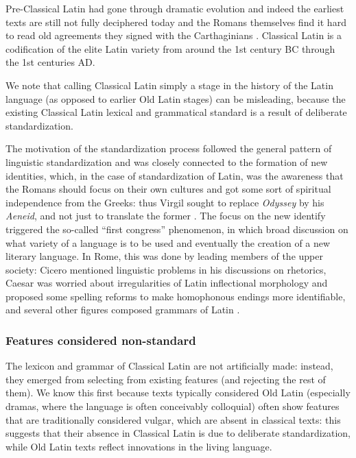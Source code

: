 \documentclass[a4paper, oneside, 12pt]{report}
\newcommand*{\citepage}[1]{p.~{#1}}
\newcommand*{\citepages}[1]{pp.~{#1}}
\newcommand{\literature}[1]{\textit{#1}}
\begin{document}
Pre-Classical Latin had gone through dramatic evolution and indeed 
the earliest texts are still not fully deciphered today
and the Romans themselves find it hard to read old agreements they signed with the Carthaginians
\citep[\citepage{52}]{leonhardt2013latin}.
Classical Latin is a codification of the elite Latin variety from around the 1st century BC through the 1st centuries AD.

We note that calling Classical Latin simply a stage in the history of the Latin language
(as opposed to earlier Old Latin stages) can be misleading, 
because the existing Classical Latin lexical and grammatical standard is a result of deliberate standardization.

The motivation of the standardization process followed the general pattern of linguistic standardization and was closely connected to the formation of new identities,
which, in the case of standardization of Latin,
was the awareness that the Romans should focus on their own cultures
and got some sort of spiritual independence from the Greeks:
thus Virgil sought to replace \literature{Odyssey} by his \literature{Aeneid},
and not just to translate the former
\citep[\citepage{66}]{leonhardt2013latin}.
The focus on the new identify triggered the so-called ``first congress'' phenomenon,
in which broad discussion on what variety of a language is to be used
and eventually the creation of a new literary language.
In Rome, this was done by leading members of the upper society:
Cicero mentioned linguistic problems in his discussions on rhetorics,
Caesar was worried about irregularities of Latin inflectional morphology
and proposed some spelling reforms to make homophonous endings more identifiable,
and several other figures composed grammars of Latin
\citep[\citepages{60-61}]{leonhardt2013latin}.

\subsubsection{Features considered non-standard}

The lexicon and grammar of Classical Latin are not artificially made:
instead, they emerged from selecting from existing features (and rejecting the rest of them).
We know this first because texts typically considered Old Latin (especially dramas, where the language is often conceivably colloquial) often show features that are traditionally considered vulgar,
which are absent in classical texts:
this suggests that their absence in Classical Latin is due to deliberate standardization, 
while Old Latin texts reflect innovations in the living language.
\end{document}
